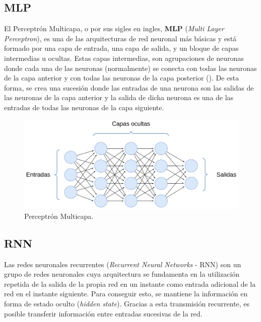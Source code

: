 
\subsection{MLP}
El Perceptrón Multicapa, o por sus sigles en ingles, \textbf{MLP} (\textit{Multi Layer Perceptron}), es una de las arquitecturas de red neuronal más básicas y está formado por una capa de entrada, una capa de salida, y un bloque de capas intermedias u ocultas. Estas capas intermedias, son agrupaciones de neuronas donde cada una de las neuronas (normalmente) se conecta con todas las neuronas de la capa anterior y con todas las neuronas de la capa posterior (). De esta forma, se crea una sucesión donde las entradas de una neurona son las salidas de las neuronas de la capa anterior y la salida de dicha neurona es una de las entradas de todas las neuronas de la capa siguiente. 

\begin{figure}[H]
\centering
\includegraphics[width=0.8\linewidth]{imagenes/mlp.png} 
\captionsetup{width=.8\linewidth}
\caption{Perceptrón Multicapa.}
\label{fig:mlp}
\end{figure}

\subsection{RNN}
Las redes neuronales recurrentes (\textit{Recurrent Neural Networks} - RNN) son un grupo de redes neuronales cuya arquitectura se fundamenta en la utilización repetida de la salida de la propia red en un instante como entrada adicional de la red en el instante siguiente. Para conseguir esto, se mantiene la información en forma de estado oculto (\textit{hidden state}). Gracias a esta transmisión recurrente, es posible transferir información entre entradas sucesivas de la red.

